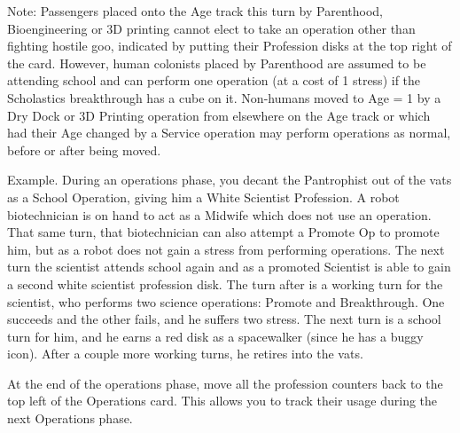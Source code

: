 \documentclass[a4paper]{book}
\begin{document}
Note: Passengers placed onto the Age track this turn by Parenthood, Bioengineering or 3D printing cannot elect to take an operation other than fighting hostile goo, indicated by putting their Profession disks at the top right of the card. However, human colonists placed by Parenthood are assumed to be attending school and can perform one operation (at a cost of 1 stress) if the Scholastics breakthrough has a cube on it. Non-humans moved to Age = 1 by a Dry Dock or 3D Printing operation from elsewhere on the Age track or which had their Age changed by a Service operation may perform operations as normal, before or after being moved.

Example. During an operations phase, you decant the Pantrophist out of the vats as a School Operation, giving him a White Scientist Profession. A robot biotechnician is on hand to act as a Midwife which does not use an operation. That same turn, that biotechnician can also attempt a Promote Op to promote him, but as a robot does not gain a stress from performing operations. The next turn the scientist attends school again and as a promoted Scientist is able to gain a second white scientist profession disk. The turn after is a working turn for the scientist, who performs two science operations: Promote and Breakthrough. One succeeds and the other fails, and he suffers two stress. The next turn is a school turn for him, and he earns a red disk as a spacewalker (since he has a buggy icon). After a couple more working turns, he retires into the vats.

At the end of the operations phase, move all the profession counters back to the top left of the Operations card. This allows you to track their usage during the next Operations phase.
 
\end{document}
